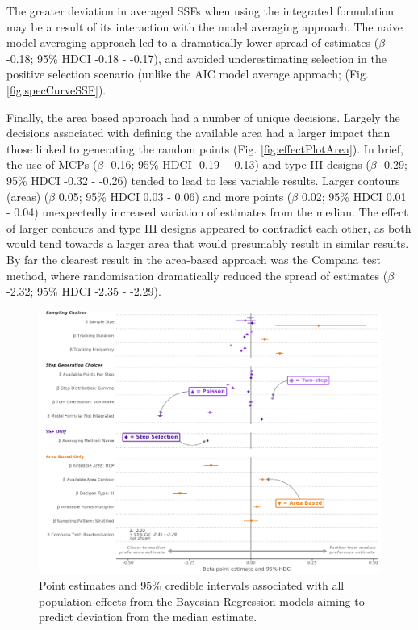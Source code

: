 \documentclass[10pt,a4paper]{article}
\begin{document}
The greater deviation in averaged SSFs when using the integrated formulation may be a result of its interaction with the model averaging approach.
The naive model averaging approach led to a dramatically lower spread of estimates (\(\beta\) -0.18; 95\% HDCI -0.18 - -0.17), and avoided underestimating selection in the positive selection scenario (unlike the AIC model average approach; (Fig. \ref{fig:specCurveSSF}).

Finally, the area based approach had a number of unique decisions.
Largely the decisions associated with defining the available area had a larger impact than those linked to generating the random points (Fig. \ref{fig:effectPlotArea}).
In brief, the use of MCPs (\(\beta\) -0.16; 95\% HDCI -0.19 - -0.13) and type III designs (\(\beta\) -0.29; 95\% HDCI -0.32 - -0.26) tended to lead to less variable results.
Larger contours (areas) (\(\beta\) 0.05; 95\% HDCI 0.03 - 0.06) and more points (\(\beta\) 0.02; 95\% HDCI 0.01 - 0.04) unexpectedly increased variation of estimates from the median.
The effect of larger contours and type III designs appeared to contradict each other, as both would tend towards a larger area that would presumably result in similar results.
By far the clearest result in the area-based approach was the Compana test method, where randomisation dramatically reduced the spread of estimates (\(\beta\) -2.32; 95\% HDCI -2.35 - -2.29).

\begin{figure}
\includegraphics[width=1\linewidth]{../figures/_allEffectsPlot} \caption{Point estimates and 95\% credible intervals associated  with all population effects from the Bayesian Regression models aiming to predict deviation from the median estimate.}\label{fig:allEffectsPlot}
\end{figure}
\end{document}
